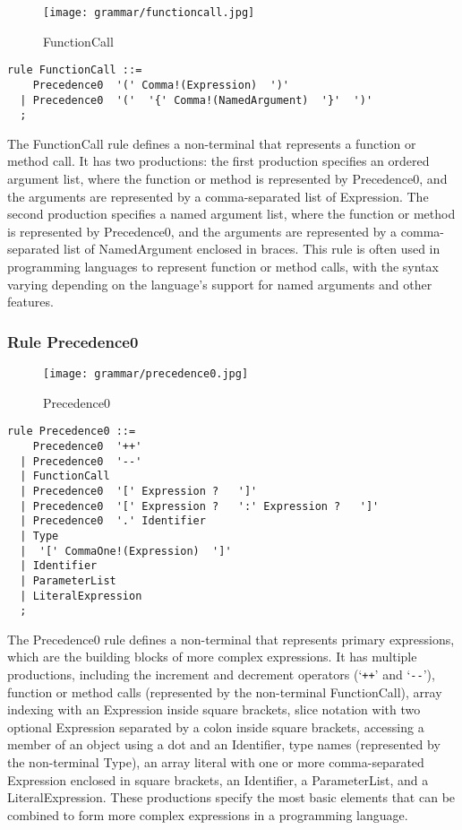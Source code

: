 \begin{figure}[!ht]
\centering
\texttt{[image: grammar/functioncall.jpg]}
\caption{FunctionCall}
\end{figure}

\begin{lstlisting}
rule FunctionCall ::=
    Precedence0  '(' Comma!(Expression)  ')' 
  | Precedence0  '('  '{' Comma!(NamedArgument)  '}'  ')' 
  ;
\end{lstlisting}

The FunctionCall rule defines a non-terminal that represents a function or method call. It has two productions: the first production specifies an ordered argument list, where the function or method is represented by Precedence0, and the arguments are represented by a comma-separated list of Expression. The second production specifies a named argument list, where the function or method is represented by Precedence0, and the arguments are represented by a comma-separated list of NamedArgument enclosed in braces. This rule is often used in programming languages to represent function or method calls, with the syntax varying depending on the language's support for named arguments and other features.

\subsubsection*{Rule Precedence0}

\begin{figure}[!ht]
\centering
\texttt{[image: grammar/precedence0.jpg]}
\caption{Precedence0}
\end{figure}

\begin{lstlisting}
rule Precedence0 ::=
    Precedence0  '++' 
  | Precedence0  '--' 
  | FunctionCall 
  | Precedence0  '[' Expression ?   ']' 
  | Precedence0  '[' Expression ?   ':' Expression ?   ']' 
  | Precedence0  '.' Identifier 
  | Type 
  |  '[' CommaOne!(Expression)  ']' 
  | Identifier 
  | ParameterList 
  | LiteralExpression 
  ;
\end{lstlisting}

The Precedence0 rule defines a non-terminal that represents primary expressions, which are the building blocks of more complex expressions. It has multiple productions, including the increment and decrement operators (`\verb|++|' and `\verb|--|'), function or method calls (represented by the non-terminal FunctionCall), array indexing with an Expression inside square brackets, slice notation with two optional Expression separated by a colon inside square brackets, accessing a member of an object using a dot and an Identifier, type names (represented by the non-terminal Type), an array literal with one or more comma-separated Expression enclosed in square brackets, an Identifier, a ParameterList, and a LiteralExpression. These productions specify the most basic elements that can be combined to form more complex expressions in a programming language.

